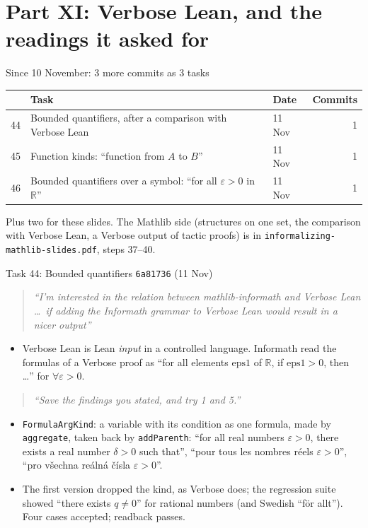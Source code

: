 \documentclass[10pt,aspectratio=169]{beamer}
\newcommand{\bad}[1]{\textcolor{warn}{#1}}
\newcommand{\ok}[1]{\textcolor{good}{#1}}
\newcommand{\commit}[1]{\texttt{\footnotesize #1}}
\newcommand{\prompt}[1]{\begin{quote}\small\itshape ``#1''\end{quote}}
\begin{document}
\section{Part XI: Verbose Lean, and the readings it asked for}

\begin{frame}{Since 10 November: 3 more commits as 3 tasks}
  \footnotesize
  \begin{tabular}{rllr}
    \toprule
    & \textbf{Task} & \textbf{Date} & \textbf{Commits} \\
    \midrule
    44 & Bounded quantifiers, after a comparison with Verbose Lean & 11 Nov & 1 \\
    45 & Function kinds: ``function from $A$ to $B$'' & 11 Nov & 1 \\
    46 & Bounded quantifiers over a symbol: ``for all $\varepsilon > 0$ in $\mathbb{R}$'' & 11 Nov & 1 \\
    \bottomrule
  \end{tabular}

  \vspace{0.5em}
  Plus two for these slides. The Mathlib side (structures on one set, the comparison with
  Verbose Lean, a Verbose output of tactic proofs) is in
  \texttt{informalizing-mathlib-slides.pdf}, steps 37--40.
\end{frame}

\begin{frame}{Task 44: Bounded quantifiers}
  \commit{6a81736} (11 Nov)
  \prompt{I'm interested in the relation between mathlib-informath and Verbose Lean \ldots\ if
  adding the Informath grammar to Verbose Lean would result in a nicer output}
  \begin{itemize}\small
    \item Verbose Lean is Lean \emph{input} in a controlled language. Informath read the
          formulas of a Verbose proof as \bad{``for all elements $\mathrm{eps1}$ of
          $\mathbb{R}$, if $\mathrm{eps1} > 0$, then \ldots''} for $\forall \varepsilon > 0$.
  \end{itemize}
  \prompt{Save the findings you stated, and try 1 and 5.}
  \begin{itemize}\small
    \item \texttt{FormulaArgKind}: a variable with its condition as one formula, made by
          \texttt{aggregate}, taken back by \texttt{addParenth}: \ok{``for all real numbers
          $\varepsilon > 0$, there exists a real number $\delta > 0$ such that''}, ``pour tous
          les nombres réels $\varepsilon > 0$'', ``pro všechna reálná čísla $\varepsilon > 0$''.
    \item The first version dropped the kind, as Verbose does; the regression suite showed
          \bad{``there exists $q \neq 0$''} for rational numbers (and Swedish \bad{``för
          allt''}). Four cases accepted; readback passes.
  \end{itemize}
\end{frame}
\end{document}
